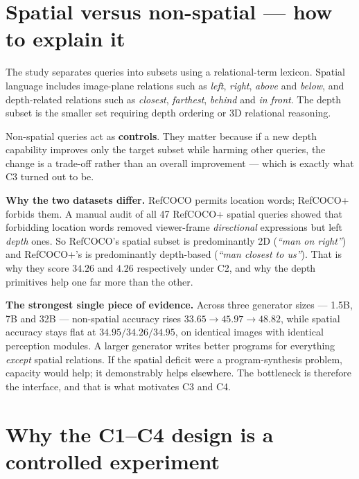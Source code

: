 \documentclass[11pt,a4paper]{article}
\begin{document}
\section{Spatial versus non-spatial --- how to explain it}

The study separates queries into subsets using a relational-term lexicon. Spatial
language includes image-plane relations such as \emph{left}, \emph{right},
\emph{above} and \emph{below}, and depth-related relations such as \emph{closest},
\emph{farthest}, \emph{behind} and \emph{in front}. The depth subset is the smaller
set requiring depth ordering or 3D relational reasoning.

Non-spatial queries act as \textbf{controls}. They matter because if a new depth
capability improves only the target subset while harming other queries, the change is
a trade-off rather than an overall improvement --- which is exactly what C3 turned out
to be.

\begin{callout}
\textbf{Why the two datasets differ.} RefCOCO permits location words; RefCOCO+ forbids
them. A manual audit of all 47 RefCOCO+ spatial queries showed that forbidding location
words removed viewer-frame \emph{directional} expressions but left \emph{depth} ones.
So RefCOCO's spatial subset is predominantly 2D (\emph{``man on right''}) and
RefCOCO+'s is predominantly depth-based (\emph{``man closest to us''}). That is why
they score $34.26$ and $4.26$ respectively under C2, and why the depth primitives help
one far more than the other.
\end{callout}

\begin{callout}
\textbf{The strongest single piece of evidence.} Across three generator sizes ---
1.5B, 7B and 32B --- non-spatial accuracy rises $33.65 \rightarrow 45.97 \rightarrow
48.82$, while spatial accuracy stays flat at $34.95 / 34.26 / 34.95$, on identical
images with identical perception modules. A larger generator writes better programs for
everything \emph{except} spatial relations. If the spatial deficit were a
program-synthesis problem, capacity would help; it demonstrably helps elsewhere. The
bottleneck is therefore the interface, and that is what motivates C3 and C4.
\end{callout}

\section{Why the C1--C4 design is a controlled experiment}
\end{document}
